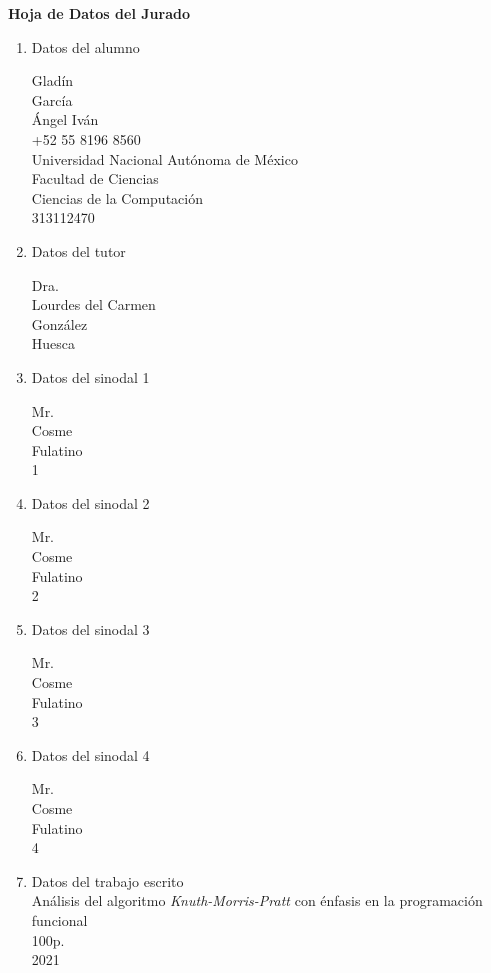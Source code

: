 
\begin{center}
{\large \textbf{Hoja de Datos del Jurado}}
\end{center}
\begin{enumerate}

\item Datos del alumno

Gladín \\
García \\
Ángel Iván \\
+52 55 8196 8560 \\
Universidad Nacional Autónoma de México \\
Facultad de Ciencias \\
Ciencias de la Computación \\
313112470

\item Datos del tutor

Dra. \\
Lourdes del Carmen \\
González \\
Huesca

\item Datos del sinodal 1

Mr. \\
Cosme \\
Fulatino \\
1

\item Datos del sinodal 2

Mr. \\
Cosme \\
Fulatino \\
2

\item Datos del sinodal 3 

Mr. \\
Cosme \\
Fulatino \\
3

\item Datos del sinodal 4

Mr. \\
Cosme \\
Fulatino \\
4

\item Datos del trabajo escrito \\
Análisis del algoritmo \textit{Knuth-Morris-Pratt} con énfasis en la programación funcional \\
100p. \\
2021 

\end{enumerate} 
